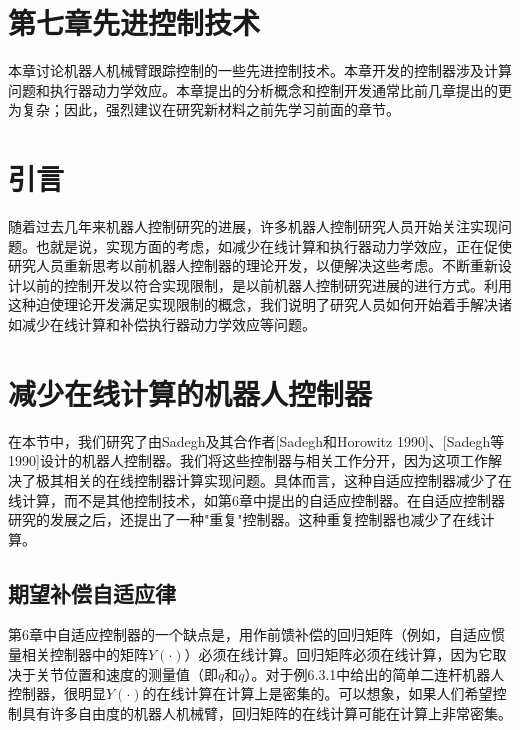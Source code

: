 \documentclass[UTF8]{ctexart}
\begin{document}
  \section*{第七章\quad 先进控制技术}
\fi

本章讨论机器人机械臂跟踪控制的一些先进控制技术。本章开发的控制器涉及计算问题和执行器动力学效应。本章提出的分析概念和控制开发通常比前几章提出的更为复杂；因此，强烈建议在研究新材料之前先学习前面的章节。

\section{引言}

随着过去几年来机器人控制研究的进展，许多机器人控制研究人员开始关注实现问题。也就是说，实现方面的考虑，如减少在线计算和执行器动力学效应，正在促使研究人员重新思考以前机器人控制器的理论开发，以便解决这些考虑。不断重新设计以前的控制开发以符合实现限制，是以前机器人控制研究进展的进行方式。利用这种迫使理论开发满足实现限制的概念，我们说明了研究人员如何开始着手解决诸如减少在线计算和补偿执行器动力学效应等问题。

\section{减少在线计算的机器人控制器}

在本节中，我们研究了由Sadegh及其合作者[Sadegh和Horowitz 1990]、[Sadegh等1990]设计的机器人控制器。我们将这些控制器与相关工作分开，因为这项工作解决了极其相关的在线控制器计算实现问题。具体而言，这种自适应控制器减少了在线计算，而不是其他控制技术，如第6章中提出的自适应控制器。在自适应控制器研究的发展之后，还提出了一种"重复"控制器。这种重复控制器也减少了在线计算。

\subsection{期望补偿自适应律}

第6章中自适应控制器的一个缺点是，用作前馈补偿的回归矩阵（例如，自适应惯量相关控制器中的矩阵$Y(\cdot)$）必须在线计算。回归矩阵必须在线计算，因为它取决于关节位置和速度的测量值（即$q$和$\dot{q}$）。对于例6.3.1中给出的简单二连杆机器人控制器，很明显$Y(\cdot)$的在线计算在计算上是密集的。可以想象，如果人们希望控制具有许多自由度的机器人机械臂，回归矩阵的在线计算可能在计算上非常密集。
\end{document}
